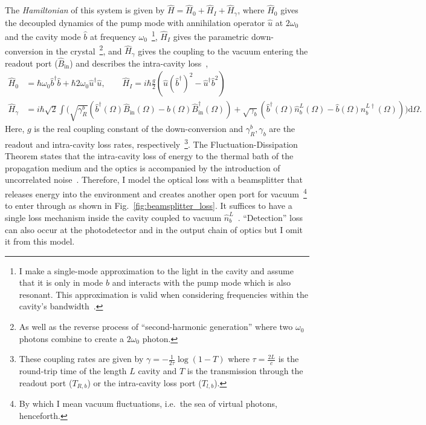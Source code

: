 The \emph{Hamiltonian} of this system is given by $\hat H = \hat H_0 + \hat H_I + \hat H_\gamma$, where $\hat H_0$ gives the decoupled dynamics of the pump mode with annihilation operator $\hat u$ at $2\omega_0$ and the cavity mode $\hat b$ at frequency $\omega_0$~\footnote{I make a single-mode approximation to the light in the cavity and assume that it is only in mode $\hat b$ and interacts with the pump mode which is also resonant. This approximation is valid when considering frequencies within the cavity's bandwidth~\cite{walls_1995}.}, $\hat H_I$ gives the parametric down-conversion in the crystal~\footnote{As well as the reverse process of ``second-harmonic generation'' where two $\omega_0$ photons combine to create a $2\omega_0$ photon.}, and $\hat H_\gamma$ gives the coupling to the vacuum entering the readout port ($\hat B_\text{in}$) and describes the intra-cavity loss~\cite{korobkoQuantumExpanderGravitationalwave2019}, 
\begin{align}
\hat H_0 &= \hbar \omega_0 \hat b^\dag \hat b + \hbar 2 \omega_0 \hat u^\dag \hat u, \qquad \hat H_I = i \hbar \frac{g}{2} (\hat u (\hat b^\dag)^2 - \hat u^\dag \hat b^2)\nonumber\\
\hat H_\gamma &= i\hbar \sqrt{2}\int \biggl( \sqrt{\gamma^b_R}\left(\hat{b}^\dag(\Omega)\hat{B}_\text{in}(\Omega)-\hat{b}(\Omega)\hat{B}_\text{in}^\dag(\Omega)\right) + \sqrt{\gamma_b}\left(\hat{b}^\dag(\Omega)\hat n^L_b(\Omega)-\hat{b}(\Omega)\hat{n}^{L\dag}_b(\Omega)\right)\biggr)\text{d}\Omega .\nonumber
\end{align} %
Here, $g$ is the real coupling constant of the down-conversion and $\gamma^b_R,\gamma_b$ are the readout and intra-cavity loss rates, respectively~\footnote{These coupling rates are given by $\gamma = -\frac{1}{2\tau}\log(1-T)$ where $\tau = \frac{2L}{c}$ is the round-trip time of the length $L$ cavity and $T$ is the transmission through the readout port ($T_{R,b}$) or the intra-cavity loss port ($T_{l,b}$).}. %
The Fluctuation-Dissipation Theorem states that the intra-cavity loss of energy to the thermal bath of the propagation medium and the optics is accompanied by the introduction of uncorrelated noise~\cite{landau_lifshitz_1980}. Therefore, I model the optical loss with a beamsplitter that releases energy into the environment and creates another open port for vacuum~\footnote{By which I mean vacuum fluctuations, i.e.\ the sea of virtual photons, henceforth.} to enter through as shown in Fig.~\ref{fig:beamsplitter_loss}. It suffices to have a single loss mechanism inside the cavity coupled to vacuum $\hat n^L_b$~\cite{danilishinQuantumMeasurementTheory2012}. ``Detection'' loss can also occur at the photodetector and in the output chain of optics but I omit it from this model.


